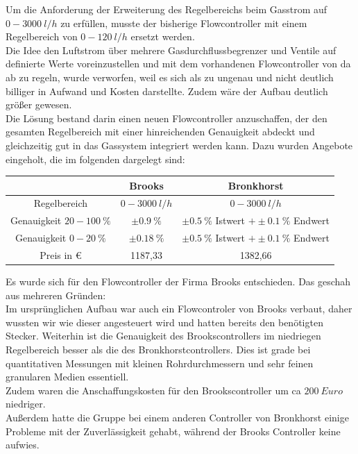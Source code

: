 Um die Anforderung der Erweiterung des Regelbereichs beim Gasstrom auf $\SI{0} - \SI{3000}{l/h}$ zu erfüllen, musste der bisherige Flowcontroller mit einem Regelbereich von $\SI{0} - \SI{120}{l/h}$ ersetzt werden. \\
Die Idee den Luftstrom über mehrere Gasdurchflussbegrenzer und Ventile auf definierte Werte voreinzustellen und mit dem vorhandenen Flowcontroller von da ab zu regeln, wurde verworfen, weil es sich als zu ungenau und nicht deutlich billiger in Aufwand und Kosten darstellte. Zudem wäre der Aufbau deutlich größer gewesen. \\
Die Lösung bestand darin einen neuen Flowcontroller anzuschaffen, der den gesamten Regelbereich mit einer hinreichenden Genauigkeit abdeckt und gleichzeitig gut in das Gassystem integriert werden kann. Dazu wurden Angebote eingeholt, die im folgenden dargelegt sind:

\begin{tabular}{|c|c|c|}
	\hline  & Brooks & Bronkhorst \\ 
	\hline Regelbereich & $\SI{0} - \SI{3000}{l/h}$ & $\SI{0} - \SI{3000}{l/h}$ \\ 
	\hline Genauigkeit $20 - \SI{100}{\%}$ & $\pm \SI{0,9}{\%}$ & $\pm \SI{0,5}{\%}$ Istwert $+ \pm \SI{0,1}{\%}$ Endwert\\ 
	\hline Genauigkeit $0 - \SI{20}{\%}$ & $\pm \SI{0,18}{\%}$ & $\pm \SI{0,5}{\%}$ Istwert $+ \pm \SI{0,1}{\%}$ Endwert \\ 
	\hline Preis in \euro & 1187,33 & 1382,66 \\ 
	\hline 
\end{tabular} 

\vspace{0,5cm}

Es wurde sich für den Flowcontroller der Firma Brooks entschieden. Das geschah aus mehreren Gründen: \\
Im ursprünglichen Aufbau war auch ein Flowcontroler von Brooks verbaut, daher wussten wir wie dieser angesteuert wird und hatten bereits den benötigten Stecker. Weiterhin ist die Genauigkeit des Brookscontrollers im niedriegen Regelbereich besser als die des Bronkhorstcontrollers. Dies ist grade bei quantitativen Messungen mit kleinen Rohrdurchmessern und sehr feinen granularen Medien essentiell. \\
Zudem waren die Anschaffungskosten für den Brookscontroller um ca $\SI{200}{Euro}$ niedriger.\\
Außerdem hatte die Gruppe bei einem anderen Controller von Bronkhorst einige Probleme mit der Zuverlässigkeit gehabt, während der Brooks Controller keine aufwies.



